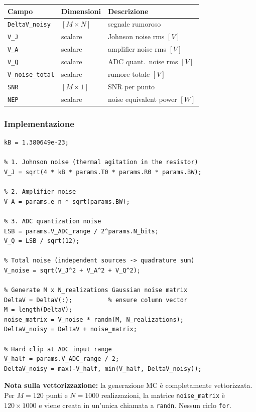 \documentclass[11pt,a4paper]{article}
\begin{document}
\begin{center}
\begin{tabular}{lll}
\toprule
Campo & Dimensioni & Descrizione \\
\midrule
\texttt{DeltaV\_noisy}  & $[M \times N]$ & segnale rumoroso \\
\texttt{V\_J}           & scalare & Johnson noise rms $[V]$ \\
\texttt{V\_A}           & scalare & amplifier noise rms $[V]$ \\
\texttt{V\_Q}           & scalare & ADC quant.\ noise rms $[V]$ \\
\texttt{V\_noise\_total}& scalare & rumore totale $[V]$ \\
\texttt{SNR}            & $[M \times 1]$ & SNR per punto \\
\texttt{NEP}            & scalare & noise equivalent power $[W]$ \\
\bottomrule
\end{tabular}
\end{center}

\subsubsection*{Implementazione}

\begin{lstlisting}[caption={add\_noise\_to\_signal.m --- calcolo rumore e generazione MC}]
kB = 1.380649e-23;

% 1. Johnson noise (thermal agitation in the resistor)
V_J = sqrt(4 * kB * params.T0 * params.R0 * params.BW);

% 2. Amplifier noise
V_A = params.e_n * sqrt(params.BW);

% 3. ADC quantization noise
LSB = params.V_ADC_range / 2^params.N_bits;
V_Q = LSB / sqrt(12);

% Total noise (independent sources -> quadrature sum)
V_noise = sqrt(V_J^2 + V_A^2 + V_Q^2);

% Generate M x N_realizations Gaussian noise matrix
DeltaV = DeltaV(:);          % ensure column vector
M = length(DeltaV);
noise_matrix = V_noise * randn(M, N_realizations);
DeltaV_noisy = DeltaV + noise_matrix;

% Hard clip at ADC input range
V_half = params.V_ADC_range / 2;
DeltaV_noisy = max(-V_half, min(V_half, DeltaV_noisy));
\end{lstlisting}

\begin{infobox}
\textbf{Nota sulla vettorizzazione:} la generazione MC è completamente
vettorizzata. Per $M = 120$ punti e $N = 1000$ realizzazioni, la matrice
\texttt{noise\_matrix} è $120 \times 1000$ e viene creata in un'unica
chiamata a \texttt{randn}. Nessun ciclo \texttt{for}.
\end{infobox}
\end{document}
